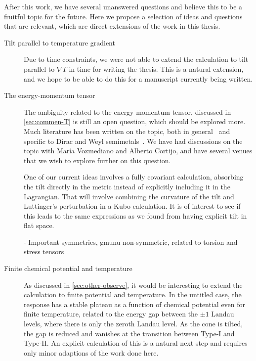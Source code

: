 After this work, we have several unanswered questions and believe this to be a fruitful topic for the future.
Here we propose a selection of ideas and questions that are relevant, which are direct extensions of the work in this thesis.
\begin{description}
  \item[Tilt parallel to temperature gradient]
        Due to time constraints, we were not able to extend the calculation to tilt parallel to \( \nabla T \) in time for writing the thesis.
        This is a natural extension, and we hope to be able to do this for a manuscript currently being written.

  \item[The energy-momentum tensor]
        The ambiguity related to the energy\hyp{}momentum tensor, discussed in \cref{sec:commen-T} is still an open question, which should be explored more.
        Much literature has been written on the topic, both in general~\cite{forgerCurrentsEnergyMomentumTensor2004} and specific to Dirac and Weyl semimetals~\cite{vanderwurffMagnetovorticalThermoelectricTransport2019,arjonaFingerprintsConformalAnomaly2019}.
        We have had discussions on the topic with María Vozmediano and Alberto Cortijo, and have several venues that we wish to explore further on this question.

        One of our current ideas involves a fully covariant calculation, absorbing the tilt directly in the metric instead of explicitly including it in the Lagrangian.
        That will involve combining the curvature of the tilt and Luttinger's perturbation in a Kubo calculation.
        It is of interest to see if this leads to the same expressions as we found from having explicit tilt in flat space.

        - Important symmetries, gmunu non-symmetric, related to torsion and stress tensors

  \item[Finite chemical potential and temperature]
        As discussed in \cref{sec:other-observe}, it would be interesting to extend the calculation to finite potential and temperature.
        In the untitled case, the response has a stable plateau as a function of chemical potential even for finite temperature, related to the energy gap between the \( \pm 1 \) Landau levels, where there is only the zeroth Landau level.
        As the cone is tilted, the gap is reduced and vanishes at the transition between Type-I and Type-II.
        An explicit calculation of this is a natural next step and requires only minor adaptions of the work done here.

\end{description}
